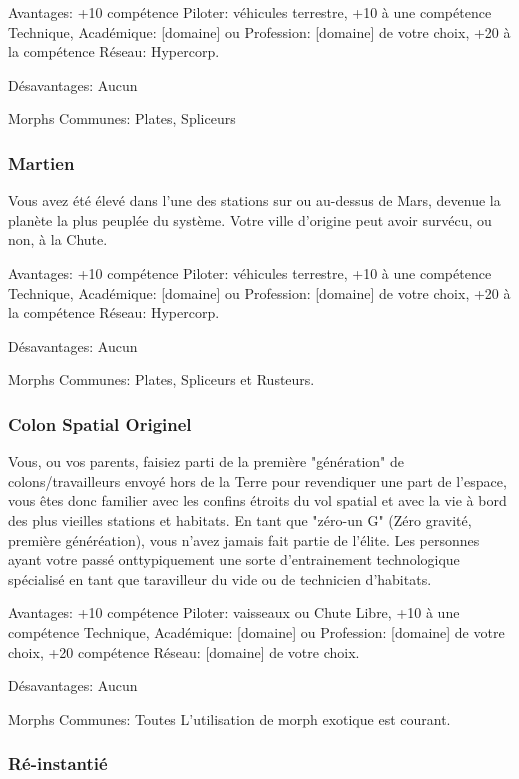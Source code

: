 Avantages: +10 compétence Piloter: véhicules terrestre, +10 à une compétence Technique, Académique: [domaine] ou Profession: [domaine] de votre choix, +20 à la compétence Réseau: Hypercorp. 

Désavantages: Aucun 

Morphs Communes: Plates, Spliceurs 





\subsubsection{Martien} \label{sec:martian} 

Vous avez été élevé dans l'une des stations sur ou au-dessus de Mars, devenue la planète la plus peuplée du système. Votre ville d'origine peut avoir survécu, ou non, à la Chute. 

Avantages: +10 compétence Piloter: véhicules terrestre, +10 à une compétence Technique, Académique: [domaine] ou Profession: [domaine] de votre choix, +20 à la compétence Réseau: Hypercorp. 

Désavantages: Aucun 

Morphs Communes: Plates, Spliceurs et Rusteurs. 

\subsubsection{Colon Spatial Originel} \label{sec:original-space-colonist} 

Vous, ou vos parents, faisiez parti de la première "génération" de colons/travailleurs envoyé hors de la Terre pour revendiquer une part de l'espace, vous êtes donc familier avec les confins étroits du vol spatial et avec la vie à bord des plus vieilles stations et habitats. En tant que "zéro-un G" (Zéro gravité, première généréation), vous n'avez jamais fait partie de l'élite. Les personnes ayant votre passé onttypiquement une sorte d'entrainement technologique spécialisé en tant que taravilleur du vide ou de technicien d'habitats. 

Avantages: +10 compétence Piloter: vaisseaux ou Chute Libre, +10 à une compétence Technique, Académique: [domaine] ou Profession: [domaine] de votre choix, +20 compétence Réseau: [domaine] de votre choix. 

Désavantages: Aucun 

Morphs Communes: Toutes L'utilisation de morph exotique est courant. 

\subsubsection{Ré-instantié} \label{sec:re-instantiated} 


